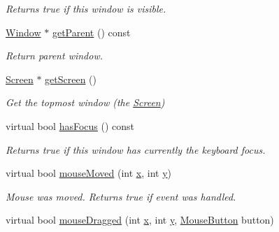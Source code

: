 \begin{DoxyCompactItemize}
\begin{DoxyCompactList}\small\item\em Returns {\ttfamily true} if this window is visible. \end{DoxyCompactList}\item 
\hyperlink{classGUI_1_1Window}{Window} $\ast$ \hyperlink{classGUI_1_1Window_a6b22ed4bc9325ba95e406f2dd3a152a2}{get\-Parent} () const 
\begin{DoxyCompactList}\small\item\em Return parent window. \end{DoxyCompactList}\item 
\hypertarget{classGUI_1_1Window_ae44c4f740234c5b69a7edf1824101957}{\hyperlink{classGUI_1_1Screen}{Screen} $\ast$ \hyperlink{classGUI_1_1Window_ae44c4f740234c5b69a7edf1824101957}{get\-Screen} ()}\label{classGUI_1_1Window_ae44c4f740234c5b69a7edf1824101957}

\begin{DoxyCompactList}\small\item\em Get the topmost window (the \hyperlink{classGUI_1_1Screen}{Screen}) \end{DoxyCompactList}\item 
\hypertarget{classGUI_1_1Window_a8f18763df9af7f1f4b7ce119a966866d}{virtual bool \hyperlink{classGUI_1_1Window_a8f18763df9af7f1f4b7ce119a966866d}{has\-Focus} () const }\label{classGUI_1_1Window_a8f18763df9af7f1f4b7ce119a966866d}

\begin{DoxyCompactList}\small\item\em Returns {\ttfamily true} if this window has currently the keyboard focus. \end{DoxyCompactList}\item 
\hypertarget{classGUI_1_1Window_a7ac4ce83561f33c1f0f91798068bab6c}{virtual bool \hyperlink{classGUI_1_1Window_a7ac4ce83561f33c1f0f91798068bab6c}{mouse\-Moved} (int \hyperlink{classGUI_1_1Window_a6ca6a80ca00c9e1d8ceea8d3d99a657d}{x}, int \hyperlink{classGUI_1_1Window_a0ee8e923aff2c3661fc2e17656d37adf}{y})}\label{classGUI_1_1Window_a7ac4ce83561f33c1f0f91798068bab6c}

\begin{DoxyCompactList}\small\item\em Mouse was moved. Returns true if event was handled. \end{DoxyCompactList}\item 
\hypertarget{classGUI_1_1Window_aabcaf5fde42d86523e2526ce54c50065}{virtual bool \hyperlink{classGUI_1_1Window_aabcaf5fde42d86523e2526ce54c50065}{mouse\-Dragged} (int \hyperlink{classGUI_1_1Window_a6ca6a80ca00c9e1d8ceea8d3d99a657d}{x}, int \hyperlink{classGUI_1_1Window_a0ee8e923aff2c3661fc2e17656d37adf}{y}, \hyperlink{namespaceGUI_ad06082a7b02aa73697f39eb8e0856de9}{Mouse\-Button} button)}\label{classGUI_1_1Window_aabcaf5fde42d86523e2526ce54c50065}


\end{DoxyCompactItemize}
